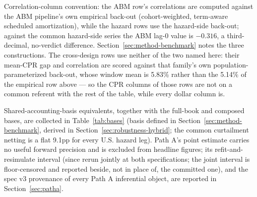 \documentclass[12pt]{article}
\begin{document}
\begin{table}[!tp]
\begin{threeparttable}
\begin{tablenotes}[flushleft]
\item Correlation-column convention: the ABM row's correlations are computed against the ABM pipeline's own empirical back-out (cohort-weighted, term-aware scheduled amortization), while the hazard rows use the hazard-side back-out; against the common hazard-side series the ABM lag-0 value is $-0.316$, a third-decimal, no-verdict difference. Section~\ref{sec:method-benchmark} notes the three constructions. The cross-design rows use neither of the two named here: their mean-CPR gap and correlation are scored against that family's own population-parameterized back-out, whose window mean is 5.83\% rather than the 5.14\% of the empirical row above --- so the CPR columns of those rows are not on a common referent with the rest of the table, while every dollar column is.
\item Shared-accounting-basis equivalents, together with the full-book and composed bases, are collected in Table~\ref{tab:bases} (basis defined in Section~\ref{sec:method-benchmark}, derived in Section~\ref{sec:robustness-hybrid}; the common curtailment netting is a flat 9.1pp for every U.S. hazard leg). Path A's point estimate carries no useful forward precision and is excluded from headline figures; its refit-and-resimulate interval (since rerun jointly at both specifications; the joint interval is floor-censored and reported beside, not in place of, the committed one), and the spec v3 provenance of every Path A inferential object, are reported in Section~\ref{sec:patha}.
\end{tablenotes}
\end{threeparttable}
\end{table}
\end{document}
